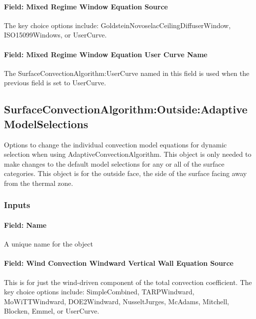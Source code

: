 \paragraph{Field: Mixed Regime Window Equation Source}\label{field-mixed-regime-window-equation-source}

The key choice options include: GoldsteinNovoselacCeilingDiffuserWindow, ISO15099Windows, or UserCurve.

\paragraph{Field: Mixed Regime Window Equation User Curve Name}\label{field-mixed-regime-window-equation-user-curve-name}

The SurfaceConvectionAlgorithm:UserCurve named in this field is used when the previous field is set to UserCurve.

\subsection{SurfaceConvectionAlgorithm:Outside:AdaptiveModelSelections}\label{surfaceconvectionalgorithmoutsideadaptivemodelselections}

Options to change the individual convection model equations for dynamic selection when using AdaptiveConvectionAlgorithm. This object is only needed to make changes to the default model selections for any or all of the surface categories. This object is for the outside face, the side of the surface facing away from the thermal zone.

\subsubsection{Inputs}\label{inputs-7}

\paragraph{Field: Name}\label{field-name-6}

A unique name for the object

\paragraph{Field: Wind Convection Windward Vertical Wall Equation Source}\label{field-wind-convection-windward-vertical-wall-equation-source}

This is for just the wind-driven component of the total convection coefficient. The key choice options include: SimpleCombined, TARPWindward, MoWiTTWindward, DOE2Windward, NusseltJurges, McAdams, Mitchell, Blocken, Emmel, or UserCurve.

